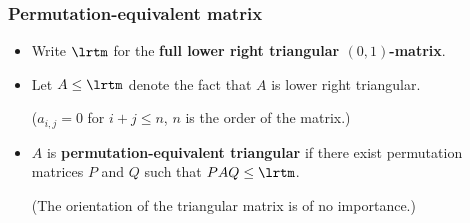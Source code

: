 \documentclass[unknownkeysallowed,11pt]{beamer}
\begin{document}
\begin{frame}[fragile]
    \frametitle{Permutation-equivalent matrix}

    \begin{itemize}
      \item
      Write $\lrtm$ for the \textbf{full lower right triangular $(0,1)$-matrix}.

      \bigskip

      \item
      Let $A \leq \lrtm$ denote the fact that $A$ is lower right triangular.

      \medskip

      ($a_{i,j} = 0$ for $i+j \leq n$, $n$ is the order of the matrix.)

      \bigskip

      \item
      $A$ is \textbf{permutation-equivalent triangular} if there exist permutation matrices
      $P$ and $Q$ such that $PAQ \leq \lrtm$.

      \medskip

      (The orientation of the triangular
      matrix is of no importance.)
    \end{itemize}
\end{frame}

\end{document}
